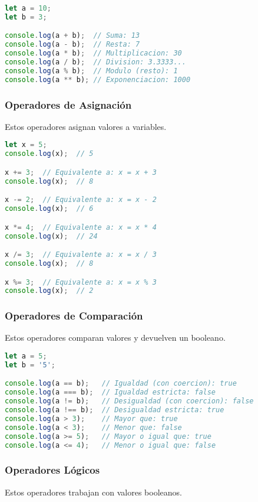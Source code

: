 \documentclass{book}
\begin{document}
\begin{lstlisting}[language=JavaScript]
let a = 10;
let b = 3;

console.log(a + b);  // Suma: 13
console.log(a - b);  // Resta: 7
console.log(a * b);  // Multiplicacion: 30
console.log(a / b);  // Division: 3.3333...
console.log(a % b);  // Modulo (resto): 1
console.log(a ** b); // Exponenciacion: 1000
\end{lstlisting}

\subsubsection{Operadores de Asignación}
Estos operadores asignan valores a variables.

\begin{lstlisting}[language=JavaScript]
let x = 5;
console.log(x);  // 5

x += 3;  // Equivalente a: x = x + 3
console.log(x);  // 8

x -= 2;  // Equivalente a: x = x - 2
console.log(x);  // 6

x *= 4;  // Equivalente a: x = x * 4
console.log(x);  // 24

x /= 3;  // Equivalente a: x = x / 3
console.log(x);  // 8

x %= 3;  // Equivalente a: x = x % 3
console.log(x);  // 2
\end{lstlisting}

\subsubsection{Operadores de Comparación}
Estos operadores comparan valores y devuelven un booleano.

\begin{lstlisting}[language=JavaScript]
let a = 5;
let b = '5';

console.log(a == b);   // Igualdad (con coercion): true
console.log(a === b);  // Igualdad estricta: false
console.log(a != b);   // Desigualdad (con coercion): false
console.log(a !== b);  // Desigualdad estricta: true
console.log(a > 3);    // Mayor que: true
console.log(a < 3);    // Menor que: false
console.log(a >= 5);   // Mayor o igual que: true
console.log(a <= 4);   // Menor o igual que: false
\end{lstlisting}

\subsubsection{Operadores Lógicos}
Estos operadores trabajan con valores booleanos.
\end{document}
